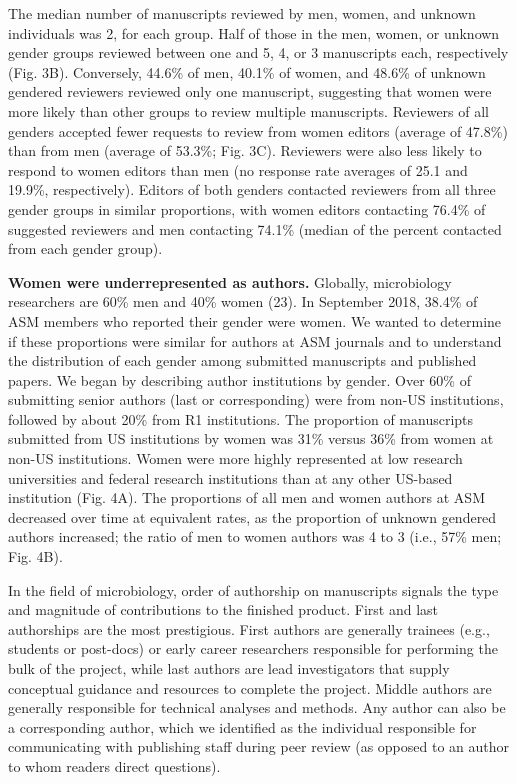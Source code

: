 \documentclass[11pt,]{article}
\begin{document}
The median number of manuscripts reviewed by men, women, and unknown
individuals was 2, for each group. Half of those in the men, women, or
unknown gender groups reviewed between one and 5, 4, or 3 manuscripts
each, respectively (Fig. 3B). Conversely, 44.6\% of men, 40.1\% of
women, and 48.6\% of unknown gendered reviewers reviewed only one
manuscript, suggesting that women were more likely than other groups to
review multiple manuscripts. Reviewers of all genders accepted fewer
requests to review from women editors (average of 47.8\%) than from men
(average of 53.3\%; Fig. 3C). Reviewers were also less likely to respond
to women editors than men (no response rate averages of 25.1 and 19.9\%,
respectively). Editors of both genders contacted reviewers from all
three gender groups in similar proportions, with women editors
contacting 76.4\% of suggested reviewers and men contacting 74.1\%
(median of the percent contacted from each gender group).

\textbf{Women were underrepresented as authors.} Globally, microbiology
researchers are 60\% men and 40\% women (23). In September 2018, 38.4\%
of ASM members who reported their gender were women. We wanted to
determine if these proportions were similar for authors at ASM journals
and to understand the distribution of each gender among submitted
manuscripts and published papers. We began by describing author
institutions by gender. Over 60\% of submitting senior authors (last or
corresponding) were from non-US institutions, followed by about 20\%
from R1 institutions. The proportion of manuscripts submitted from US
institutions by women was 31\% versus 36\% from women at non-US
institutions. Women were more highly represented at low research
universities and federal research institutions than at any other
US-based institution (Fig. 4A). The proportions of all men and women
authors at ASM decreased over time at equivalent rates, as the
proportion of unknown gendered authors increased; the ratio of men to
women authors was 4 to 3 (i.e., 57\% men; Fig. 4B).

In the field of microbiology, order of authorship on manuscripts signals
the type and magnitude of contributions to the finished product. First
and last authorships are the most prestigious. First authors are
generally trainees (e.g., students or post-docs) or early career
researchers responsible for performing the bulk of the project, while
last authors are lead investigators that supply conceptual guidance and
resources to complete the project. Middle authors are generally
responsible for technical analyses and methods. Any author can also be a
corresponding author, which we identified as the individual responsible
for communicating with publishing staff during peer review (as opposed
to an author to whom readers direct questions).
\end{document}
